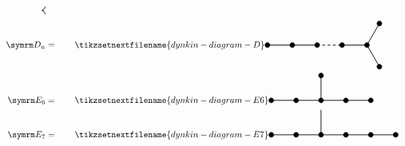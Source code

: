 \begin{align}
\begin{tikzpicture}[dynkin node/.style = {fill}, dynkin wire/.style = {thick}]
        \draw [-{>[width=0.3cm, length=0.15cm]}, dynkin wire] (4.45, 0) -- ++ (-0.001, 0);
    \end{tikzpicture}
    \\
    \D[n] &= \qquad
    \tikzsetnextfilename{dynkin-diagram-D}
    \begin{tikzpicture}[dynkin node/.style = {fill}, dynkin wire/.style = {thick}, baseline=-0.1cm]
        \draw [dynkin node] (0, 0) circle [radius=0.1cm];
        \draw [dynkin wire] (0, 0) -- ++ (2, 0);
        \draw [dynkin node] (1, 0) circle [radius=0.1cm];
        \draw [dynkin node] (2, 0) circle [radius=0.1cm];
        \draw [dynkin wire, dashed] (2, 0) -- ++ (1, 0);
        \draw [dynkin wire] (3, 0) -- (4, 0);
        \draw [dynkin wire] (4, 0) -- ++ (60:1) coordinate (A);
        \draw [dynkin wire] (4, 0) -- ++ (-60:1) coordinate (B);
        \draw [dynkin node] (3, 0) circle [radius=0.1cm];
        \draw [dynkin node] (4, 0) circle [radius=0.1cm];
        \draw [dynkin node] (A) circle [radius=0.1cm];
        \draw [dynkin node] (B) circle [radius=0.1cm];
    \end{tikzpicture}
    \\
    \E[6] &= \qquad
    \tikzsetnextfilename{dynkin-diagram-E6}
    \begin{tikzpicture}[dynkin node/.style = {fill}, dynkin wire/.style = {thick}, baseline=-0.1cm]
        \draw [dynkin wire] (0, 0) -- ++ (4, 0);
        \draw [dynkin wire] (2, 0) -- ++ (0, 1);
        \draw [dynkin node] (0, 0) circle [radius=0.1cm];
        \draw [dynkin node] (1, 0) circle [radius=0.1cm];
        \draw [dynkin node] (2, 0) circle [radius=0.1cm];
        \draw [dynkin node] (3, 0) circle [radius=0.1cm];
        \draw [dynkin node] (4, 0) circle [radius=0.1cm];
        \draw [dynkin node] (2, 1) circle [radius=0.1cm];
    \end{tikzpicture}
    \\
    \E[7] &= \qquad
    \tikzsetnextfilename{dynkin-diagram-E7}
    \begin{tikzpicture}[dynkin node/.style = {fill}, dynkin wire/.style = {thick}, baseline=-0.1cm]
        \draw [dynkin wire] (0, 0) -- ++ (5, 0);
        \draw [dynkin wire] (2, 0) -- ++ (0, 1);
        \draw [dynkin node] (0, 0) circle [radius=0.1cm];
        \draw [dynkin node] (1, 0) circle [radius=0.1cm];
        \draw [dynkin node] (2, 0) circle [radius=0.1cm];
        \draw [dynkin node] (3, 0) circle [radius=0.1cm];
        \draw [dynkin node] (4, 0) circle [radius=0.1cm];
        \draw [dynkin node] (5, 0) circle [radius=0.1cm];

\end{tikzpicture}
\end{align}

